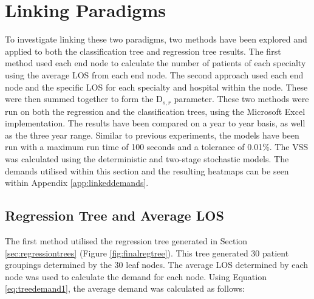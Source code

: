 \documentclass[../thesis.tex]{subfiles}
\begin{document}
\section{Linking Paradigms}\label{sec:linking}
To investigate linking these two paradigms, two methods have been explored and applied to both the classification tree and regression tree results. The first method used each end node to calculate the number of patients of each specialty using the average LOS from each end node. The second approach used each end node and the specific LOS for each specialty and hospital within the node. These were then summed together to form the D$_{s,r}$ parameter. These two methods were run on both the regression and the classification trees, using the Microsoft Excel implementation. The results have been compared on a year to year basis, as well as the three year range. Similar to previous experiments, the models have been run with a maximum run time of 100 seconds and a tolerance of 0.01\%. The VSS was calculated using the deterministic and two-stage stochastic models. The demands utilised within this section and the resulting heatmaps can be seen within Appendix \ref{app:linkeddemands}.

\subsection{Regression Tree and Average LOS}
The first method utilised the regression tree generated in Section \ref{sec:regressiontrees} (Figure \ref{fig:finalregtree}). This tree generated 30 patient groupings determined by the 30 leaf nodes. The average LOS determined by each node was used to calculate the demand for each node. Using Equation \eqref{eq:treedemand1}, the average demand was calculated as follows:
\end{document}
